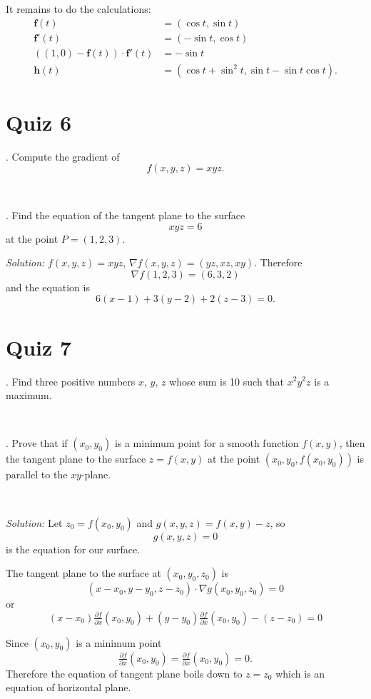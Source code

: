 \documentclass{article}
\begin{document}
It remains to do the calculations:
\begin{align*}
\mathbf{f}(t)&=(\cos t,\sin t)
\\
\mathbf{f}'(t)&=(-\sin t,\cos t)
\\
((1,0)-\mathbf{f}(t))\cdot\mathbf{f}'(t)&=-\sin t
\\
\mathbf{h}(t)&=(\cos t+\sin^2 t,\sin t-\sin t\cos t).
\end{align*}

\section*{
Quiz 6
}


. Compute the gradient of \[f(x,y,z)=xyz.\]

\ 

. Find the equation of the tangent plane to the surface \[xyz=6\] at the point $P=(1,2,3)$.


\noindent\textit{Solution:} $f(x,y,z)=xyz$, $\nabla f(x,y,z)=(yz,xz,xy)$.
Therefore 
\[\nabla f(1,2,3)=(6,3,2)\]
and the equation is 
\[6(x-1)+3(y-2)+2(z-3)=0.\]

\section*{
Quiz 7
}


. Find three positive numbers $x$, $y$, $z$ whose sum is 10 such that $x^2 y^2 z$ is a maximum.



\ 




. Prove that if $(x_0,y_0)$ is a minimum point for a smooth function
  $f(x,y)$, then the tangent plane to the surface $z=f(x,y)$ at the point $(x_0,y_0,f(x_0,y_0))$ is parallel to the $xy$-plane.

\ 
  

\noindent\textit{Solution:}
Let $z_0=f(x_0,y_0)$ and $g(x,y,z)=f(x,y)-z$, so 
\[g(x,y,z)=0\] 
is the equation for our surface.

The tangent plane to the surface 
at $(x_0,y_0,z_0)$ is
\[(x-x_0,y-y_0,z-z_0)\cdot\nabla g(x_0,y_0,z_0)=0\]
or
\[(x-x_0)\tfrac{\partial f}{\partial x}(x_0,y_0)+(y-y_0)\tfrac{\partial f}{\partial x}(x_0,y_0)-(z-z_0)=0\]

Since $(x_0,y_0)$ is a minimum point
\[\tfrac{\partial f}{\partial x}(x_0,y_0)=\tfrac{\partial f}{\partial x}(x_0,y_0)=0.\]
Therefore the equation of tangent plane boils down to 
$z=z_0$
which is an equation of horizontal plane.
\end{document}
